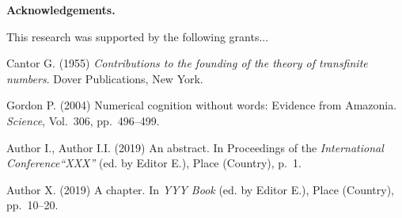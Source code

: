 \documentclass[oribibl]{llncs}
\begin{document}
\textbf{Acknowledgements.}

This research was supported by the following grants...

 \vspace{0.5cm}

\begin{thebibliography}{4}

 Cantor G. (1955) \emph{Contributions to the founding of
the theory of transfinite numbers}. Dover Publications, New York.

 Gordon P. (2004) Numerical cognition without words:
{E}vidence from {A}mazonia. \emph{Science}, Vol.~306,
pp.~496--499.

 Author I., Author I.I. (2019) An
abstract. In Proceedings of the \emph{International
Conference``XXX''} (ed. by Editor E.), Place (Country), p.~1.

 Author X. (2019) A
chapter. In \emph{YYY Book} (ed. by Editor E.), Place (Country),
pp.~10--20.

\end{thebibliography}
\end{document}
